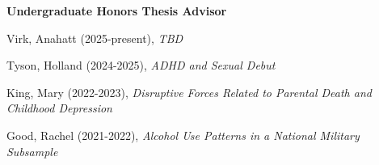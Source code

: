 \begin{comment}
\item Lacey, Conor (Oct 2022), \textit{Effect Sizes for Measurement Non-Invariance: A Review}.  Wake Forest%
\item Hwang, Yoo Ri$\dagger$ (Oct 2021), \textit{The SES-health Gradient: Comparing Two Approaches}. Wake Forest%
\item Yi, Ye Dam (Oct 2020), \textit{Feeling for Another: The Role of Emotions on Self-Other Differences in Risk-Involving Decisions}. Wake Forest%
\item Slipetz, Lindley (Sep 2020), \textit{The Structure of Depression Symptomatology: A Comparison of Factor and Network Analyses}. Wake Forest%
\item Demaske, Alana (Oct 2019), \textit{Examining the construct validity and functional utility of personal growth initiative in a war-affected Sri Lankan sample}. Wake Forest%
\end{etaremune}%
\end{comment}
{\large\textbf{Undergraduate Honors Thesis Advisor}}
\begin{etaremune}%
\item Virk, Anahatt (2025-present), \textit{TBD}
\item Tyson, Holland (2024-2025), \textit{ADHD and Sexual Debut}
\item King, Mary (2022-2023), \textit{Disruptive Forces Related to Parental Death and Childhood Depression} %
\item Good, Rachel (2021-2022), \textit{Alcohol Use Patterns in a National Military Subsample} %
\end{etaremune}%

